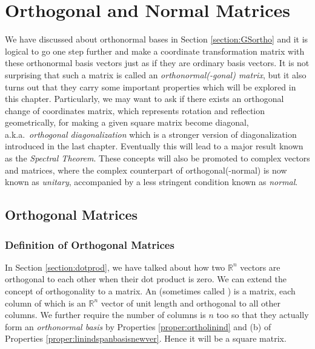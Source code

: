\chapter{Orthogonal and Normal Matrices}
\label{chap:normalmat}

We have discussed about orthonormal bases in Section \ref{section:GSortho} and it is logical to go one step further and make a coordinate transformation matrix with these orthonormal basis vectors just as if they are ordinary basis vectors. It is not surprising that such a matrix is called an \textit{orthonormal(-gonal) matrix}, but it also turns out that they carry some important properties which will be explored in this chapter. Particularly, we may want to ask if there exists an orthogonal change of coordinates matrix, which represents rotation and reflection geometrically, for making a given square matrix become diagonal, a.k.a.\ \textit{orthogonal diagonalization} which is a stronger version of diagonalization introduced in the last chapter. Eventually this will lead to a major result known as the \textit{Spectral Theorem}. These concepts will also be promoted to complex vectors and matrices, where the complex counterpart of orthogonal(-normal) is now known as \textit{unitary}, accompanied by a less stringent condition known as \textit{normal}. 

\section{Orthogonal Matrices}

\subsection{Definition of Orthogonal Matrices}
In Section \ref{section:dotprod}, we have talked about how two $\mathbb{R}^n$ vectors are orthogonal to each other when their dot product is zero. We can extend the concept of orthogonality to a matrix. An  (sometimes called ) is a matrix, each column of which is an $\mathbb{R}^n$ vector of unit length and orthogonal to all other columns. We further require the number of columns is $n$ too so that they actually form an \textit{orthonormal basis} by Properties \ref{proper:ortholinind} and (b) of Properties \ref{proper:linindspanbasisnewver}. Hence it will be a square matrix.

